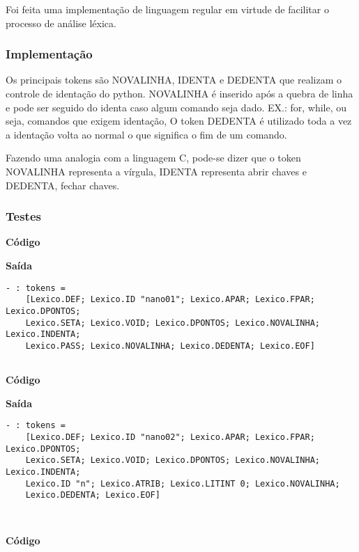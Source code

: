 \documentclass[hidelinks,12pt]{article}
\begin{document}
	Foi feita uma implementação de linguagem regular em virtude de facilitar o processo de análise léxica.
	
	\subsubsection{Implementação}
	
		Os principais tokens são NOVALINHA, IDENTA e DEDENTA que realizam o controle de identação do python. NOVALINHA é inserido após a quebra de linha e pode ser seguido do identa caso algum comando seja dado. EX.: for, while, ou seja, comandos que exigem identação, O token DEDENTA é utilizado toda a vez a identação volta ao normal o que significa o fim de um comando.
		
		Fazendo uma analogia com a linguagem C, pode-se dizer que o token NOVALINHA representa a vírgula, IDENTA representa abrir chaves e DEDENTA, fechar chaves.
		
		
	\subsubsection{Testes}
	
	
	{\large \textbf{Código} }
			
	
	{\large \textbf{Saída}}
	
	\begin{lstlisting}[caption=Analisador Léxico]
	- : tokens =
	[Lexico.DEF; Lexico.ID "nano01"; Lexico.APAR; Lexico.FPAR; Lexico.DPONTOS;
	Lexico.SETA; Lexico.VOID; Lexico.DPONTOS; Lexico.NOVALINHA; Lexico.INDENTA;
	Lexico.PASS; Lexico.NOVALINHA; Lexico.DEDENTA; Lexico.EOF]


	\end{lstlisting}
	
	{\large \textbf{Código} }
	
	
	{\large \textbf{Saída}}
	
	\begin{lstlisting}[caption=Analisador Léxico]
	- : tokens =
	[Lexico.DEF; Lexico.ID "nano02"; Lexico.APAR; Lexico.FPAR; Lexico.DPONTOS;
	Lexico.SETA; Lexico.VOID; Lexico.DPONTOS; Lexico.NOVALINHA; Lexico.INDENTA;
	Lexico.ID "n"; Lexico.ATRIB; Lexico.LITINT 0; Lexico.NOVALINHA;
	Lexico.DEDENTA; Lexico.EOF]
	
	
	\end{lstlisting}
	
	{\large \textbf{Código} }
		
	
\end{document}
